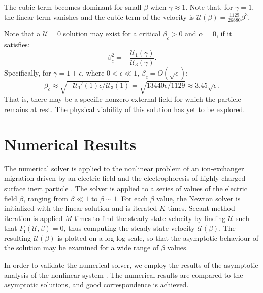 \documentclass[10pt]{ijnam}
\newcommand\eps \epsilon
\newcommand{\pars}[1]{\left(#1\right)}
\newcommand\cU{\mathscr{U}}
\begin{document}
The cubic term becomes dominant for small $\beta$ when $\gamma \approx 1$.
Note that, for $\gamma = 1$, the linear term vanishes and the cubic term 
of the velocity is $\cU(\beta) = \frac{1129}{26880}\beta^3$.

Note that a $\cU = 0$ solution may exist for a critical $\beta_c > 0$ and $\alpha = 0$, 
if it satisfies:
\begin{equation} \label{eq:crit_beta}
\beta_c^2 = -\frac{\cU_1(\gamma)}{\cU_3(\gamma)}.
\end{equation}
Specifically, for $\gamma = 1 + \eps$, where $0 < \eps \ll 1$, $\beta_c = O\pars{\sqrt{\eps}}$:
\begin{equation}
\beta_c \approx \sqrt{-{\cU_1'(1) \eps}/{\cU_3(1)}} = 
 \sqrt{{13440 \eps}/{1129}} \approx 3.45 \sqrt{\eps}.
\end{equation}
That is, there may be a specific nonzero external field for which the particle remains at rest. The physical viability of this solution has yet to be explored.

\section{Numerical Results} \label{sec:results}
The numerical solver is applied to the nonlinear problem of an ion-exchanger migration 
driven by an electric field \cite{yariv2010migration}
and the electrophoresis of highly charged surface inert particle 
\cite{schnitzer2012surface}. 
The solver is applied to a series of values of the electric field $\beta$, ranging 
from $\beta \ll 1$ to $\beta \sim 1$.
For each $\beta$ value, the Newton solver is initialized with the linear solution and is iterated $K$ times.
Secant method iteration is applied $M$ times to find the steady-state velocity 
by finding $\cU$ such that $F_\imath(\cU, \beta) = 0$, thus computing 
the steady-state velocity $\cU(\beta)$. 
The resulting $\cU(\beta)$ is plotted on a log-log scale, so that the asymptotic behaviour
of the solution may be examined for a wide range of $\beta$ values.
 
In order to validate the numerical solver, we employ 
the results of the asymptotic analysis of the nonlinear 
system \cite{schnitzer2012cubic, zeyde2012report}. 
The numerical results are compared 
to the asymptotic solutions, and good correspondence is achieved.
\end{document}
